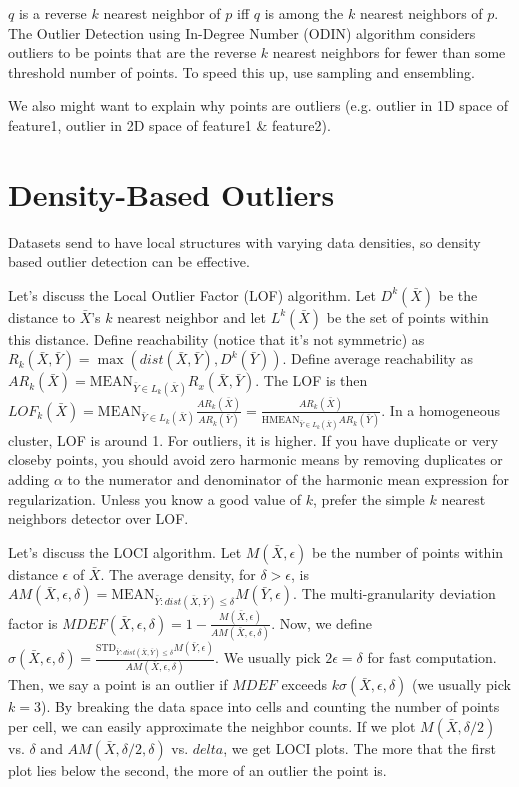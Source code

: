 \documentclass[a4paper]{article}
\begin{document}
$q$ is a reverse $k$ nearest neighbor of $p$ iff $q$ is among the $k$
nearest neighbors of $p$. The Outlier Detection using In-Degree Number (ODIN)
algorithm considers outliers to be points that are the reverse $k$ nearest
neighbors for fewer than some threshold number of points. To speed this up,
use sampling and ensembling.

We also might want to explain why points are outliers (e.g. outlier in
1D space of feature1, outlier in 2D space of feature1 & feature2).

\section{Density-Based Outliers}
Datasets send to have local structures with varying data densities, so density
based outlier detection can be effective.

Let's discuss the Local Outlier Factor (LOF) algorithm. Let $D^k(\bar{X})$ be
the distance to $\bar{X}$'s $k$ nearest neighbor and let $L^k(\bar{X})$ be the
set of points within this distance. Define reachability (notice that it's
not symmetric) as
$R_k(\bar{X}, \bar{Y}) = \max{(dist(\bar{X}, \bar{Y}), D^k(\bar{Y}))}$. Define
average reachability as $AR_k(\bar{X}) =
\textrm{MEAN}_{\bar{Y} \in L_k(\bar{X})} R_x(\bar{X}, \bar{Y})$. The LOF is then
$LOF_k(\bar{X}) = \textrm{MEAN}_{\bar{Y} \in L_k(\bar{X})} \frac{AR_k(\bar{X})}{
AR_k(\bar{Y})} = \frac{AR_k(\bar{X})}{\textrm{HMEAN}_{\bar{Y} \in L_k(\bar{X})} AR_k(\bar{Y})}$.
In a homogeneous cluster, LOF is around 1. For outliers, it is higher. If you
have duplicate or very closeby points, you should avoid zero harmonic means by
removing duplicates or adding $\alpha$ to the numerator and denominator of the
harmonic mean expression for regularization. Unless you know a good value of
$k$, prefer the simple $k$ nearest neighbors detector over LOF.

Let's discuss the LOCI algorithm. Let $M(\bar{X}, \epsilon)$ be the number of
points within distance $\epsilon$ of $\bar{X}$. The average density, for $\delta
> \epsilon$, is $AM(\bar{X}, \epsilon, \delta) = \textrm{MEAN}_{\bar{Y}:
dist(\bar{X}, \bar{Y})\leq \delta} M(\bar{Y}, \epsilon)$. The multi-granularity
deviation factor is $MDEF(\bar{X}, \epsilon, \delta) = 1 -
\frac{M(\bar{X}, \epsilon)}{AM(\bar{X}, \epsilon, \delta)}$. Now, we define
$\sigma(\bar{X}, \epsilon, \delta) = \frac{\textrm{STD}_{\bar{Y}:
dist(\bar{X}, \bar{Y})\leq \delta} M(\bar{Y}, \epsilon)}{AM(\bar{X}, \epsilon,
\delta)}$. We usually pick $2 \epsilon = \delta$ for fast computation. Then,
we say a point is an outlier if $MDEF$ exceeds $k \sigma(\bar{X}, \epsilon, \delta)$
(we usually pick $k = 3$). By breaking the data space into cells and counting
the number of points per cell, we can easily approximate the neighbor counts.
If we plot $M(\bar{X}, \delta / 2)$ vs. $\delta$ and
$AM(\bar{X}, \delta / 2, \delta)$ vs. $delta$, we get LOCI plots. The more
that the first plot lies below the second, the more of an outlier the point
is.
\end{document}
